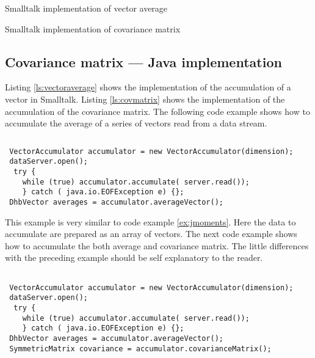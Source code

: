 \documentclass[twoside]{book}
\begin{document}
\begin{listing} Smalltalk implementation of vector average \label{ls:vectoraverage}

\end{listing}

\begin{listing} Smalltalk implementation of covariance matrix \label{ls:covmatrix}

\end{listing}

\subsection{Covariance matrix --- Java implementation}
\label{sec:jcovmatrix} Listing \ref{ls:vectoraverage} shows the
implementation of the accumulation of a vector in Smalltalk.
Listing \ref{ls:covmatrix} shows the implementation of the
accumulation of the covariance matrix. The following code example
shows how to accumulate the average of a series of vectors read
from a data stream.
\begin{codeExample}
\begin{verbatim}

\end{verbatim}
\begin{verbatim}
 VectorAccumulator accumulator = new VectorAccumulator(dimension);
 dataServer.open();
  try {
    while (true) accumulator.accumulate( server.read());
    } catch ( java.io.EOFException e) {};
 DhbVector averages = accumulator.averageVector();
\end{verbatim}
\end{codeExample}
This example is very similar to code example \ref{ex:jmoments}.
Here the data to accumulate are prepared as an array of vectors.
The next code example shows how to accumulate the both average and
covariance matrix. The little differences with the preceding
example should be self explanatory to the reader.
\begin{codeExample}
\begin{verbatim}

 VectorAccumulator accumulator = new VectorAccumulator(dimension);
 dataServer.open();
  try {
    while (true) accumulator.accumulate( server.read());
    } catch ( java.io.EOFException e) {};
 DhbVector averages = accumulator.averageVector();
 SymmetricMatrix covariance = accumulator.covarianceMatrix();
\end{verbatim}
\end{codeExample}
\end{document}
